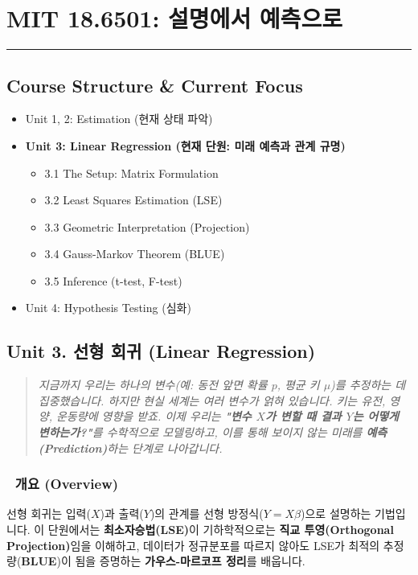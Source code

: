 \documentclass[11pt,a4paper]{book}
\theoremstyle{definition}
\begin{document}
\chapter{MIT 18.6501: 설명에서 예측으로}
\label{ch:lecture8}


\vspace{1cm}
\hrule
\vspace{1cm}

\section*{Course Structure \& Current Focus}
\begin{itemize}
    \item Unit 1, 2: Estimation (현재 상태 파악)
    \item \textbf{\textcolor{mainblue}{Unit 3: Linear Regression (현재 단원: 미래 예측과 관계 규명)}}
    \begin{itemize}
        \item 3.1 The Setup: Matrix Formulation
        \item 3.2 Least Squares Estimation (LSE)
        \item 3.3 Geometric Interpretation (Projection)
        \item 3.4 Gauss-Markov Theorem (BLUE)
        \item 3.5 Inference (t-test, F-test)
    \end{itemize}
    \item Unit 4: Hypothesis Testing (심화)
\end{itemize}


\section{Unit 3. 선형 회귀 (Linear Regression)}

\begin{quote}
\textit{지금까지 우리는 하나의 변수(예: 동전 앞면 확률 $p$, 평균 키 $\mu$)를 추정하는 데 집중했습니다. 하지만 현실 세계는 여러 변수가 얽혀 있습니다. 키는 유전, 영양, 운동량에 영향을 받죠. 이제 우리는 \textbf{"변수 $X$가 변할 때 결과 $Y$는 어떻게 변하는가?"}를 수학적으로 모델링하고, 이를 통해 보이지 않는 미래를 \textbf{예측(Prediction)}하는 단계로 나아갑니다.}
\end{quote}

\subsection*{📌 개요 (Overview)}
선형 회귀는 입력($X$)과 출력($Y$)의 관계를 선형 방정식($Y=X\beta$)으로 설명하는 기법입니다. 이 단원에서는 \textbf{최소자승법(LSE)}이 기하학적으로는 \textbf{직교 투영(Orthogonal Projection)}임을 이해하고, 데이터가 정규분포를 따르지 않아도 LSE가 최적의 추정량(\textbf{BLUE})이 됨을 증명하는 \textbf{가우스-마르코프 정리}를 배웁니다.
\end{document}
